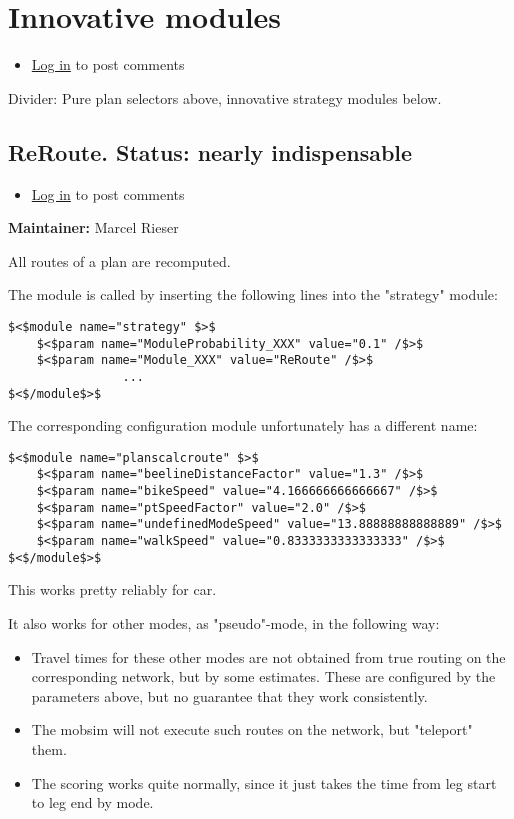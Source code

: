 \documentclass[a4paper,11pt]{report}
\begin{document}
\vfill\eject
\section{Innovative modules}

\begin{itemize}
	\item \href{http://www.matsim.org/user/login?destination=comment/reply/697%23comment-form}{Log in} to post comments
\end{itemize}

Divider: Pure plan selectors above, innovative strategy modules below.

\subsection{ReRoute.  Status: nearly indispensable}
\begin{itemize}
	\item \href{http://www.matsim.org/user/login?destination=comment/reply/573%23comment-form}{Log in} to post comments
\end{itemize}

\textbf{Maintainer:} Marcel Rieser

All routes of a plan are recomputed.

The module is called by inserting the following lines into the "strategy" module:
\begin{verbatim}
$<$module name="strategy" $>$
	$<$param name="ModuleProbability_XXX" value="0.1" /$>$
	$<$param name="Module_XXX" value="ReRoute" /$>$
                ...
$<$/module$>$
\end{verbatim}

The corresponding configuration module unfortunately has a different name:
\begin{verbatim}
$<$module name="planscalcroute" $>$
	$<$param name="beelineDistanceFactor" value="1.3" /$>$
	$<$param name="bikeSpeed" value="4.166666666666667" /$>$
	$<$param name="ptSpeedFactor" value="2.0" /$>$
	$<$param name="undefinedModeSpeed" value="13.88888888888889" /$>$
	$<$param name="walkSpeed" value="0.8333333333333333" /$>$
$<$/module$>$
\end{verbatim}

This works pretty reliably for car.

It also works for other modes, as "pseudo"-mode, in the following way:
\begin{itemize}
	\item Travel times for these other modes are not obtained from true  routing on the corresponding network, but by some estimates. These  are configured by the parameters above, but no guarantee that they work  consistently.
	\item The mobsim will not execute such routes on the network, but "teleport" them.
	\item The scoring works quite normally, since it just takes the time from leg start to leg end by mode.
\end{itemize}
\end{document}

